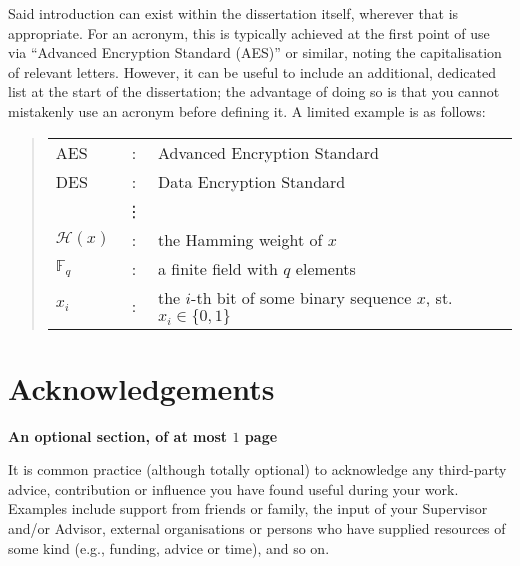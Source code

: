\documentclass[ %
                    author={Alexander Hill},
                supervisor={Dr. Benjamin Sach},
                    degree={MEng},
                     title={MARMOSET: Multi Agent Routing for Managing Online Smart-cities for Efficient Transportation},
                  subtitle={},
                      type={research},
                      year={2016} ]{dissertation}
\begin{document}
Said introduction can exist within the dissertation itself, wherever
that is appropriate.  For an acronym, this is typically achieved at
the first point of use via ``Advanced Encryption Standard (AES)'' or
similar, noting the capitalisation of relevant letters.  However, it
can be useful to include an additional, dedicated list at the start
of the dissertation; the advantage of doing so is that you cannot
mistakenly use an acronym before defining it.  A limited example is
as follows:

\begin{quote}
\noindent
\begin{tabular}{lcl}
AES                 &:     & Advanced Encryption Standard                                         \\
DES                 &:     & Data Encryption Standard                                             \\
                    &\vdots&                                                                      \\
${\mathcal H}( x )$ &:     & the Hamming weight of $x$                                            \\
${\mathbb  F}_q$    &:     & a finite field with $q$ elements                                     \\
$x_i$               &:     & the $i$-th bit of some binary sequence $x$, st. $x_i \in \{ 0, 1 \}$ \\
\end{tabular}
\end{quote}


\chapter*{Acknowledgements}

{\bf An optional section, of at most $1$ page}
\vspace{1cm}

\noindent
It is common practice (although totally optional) to acknowledge any
third-party advice, contribution or influence you have found useful
during your work.  Examples include support from friends or family,
the input of your Supervisor and/or Advisor, external organisations
or persons who  have supplied resources of some kind (e.g., funding,
advice or time), and so on.

\end{document}
